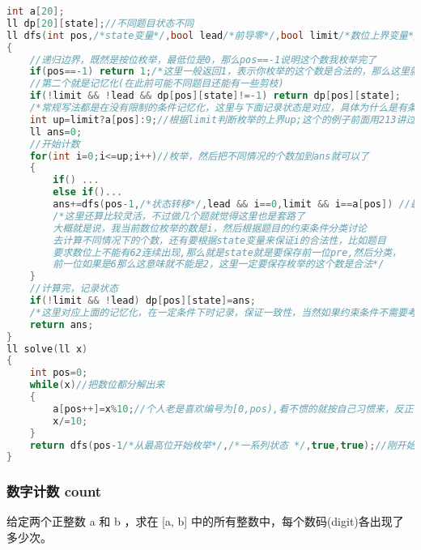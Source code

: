 \begin{lstlisting}[language=C++]
int a[20];
ll dp[20][state];//不同题目状态不同
ll dfs(int pos,/*state变量*/,bool lead/*前导零*/,bool limit/*数位上界变量*/)//不是每个题都要判断前导零
{
    //递归边界，既然是按位枚举，最低位是0，那么pos==-1说明这个数我枚举完了
    if(pos==-1) return 1;/*这里一般返回1，表示你枚举的这个数是合法的，那么这里就需要你在枚举时必须每一位都要满足题目条件，也就是说当前枚举到pos位，一定要保证前面已经枚举的数位是合法的。不过具体题目不同或者写法不同的话不一定要返回1 */
    //第二个就是记忆化(在此前可能不同题目还能有一些剪枝)
    if(!limit && !lead && dp[pos][state]!=-1) return dp[pos][state];
    /*常规写法都是在没有限制的条件记忆化，这里与下面记录状态是对应，具体为什么是有条件的记忆化后面会讲*/
    int up=limit?a[pos]:9;//根据limit判断枚举的上界up;这个的例子前面用213讲过了
    ll ans=0;
    //开始计数
    for(int i=0;i<=up;i++)//枚举，然后把不同情况的个数加到ans就可以了
    {
        if() ...
        else if()...
        ans+=dfs(pos-1,/*状态转移*/,lead && i==0,limit && i==a[pos]) //最后两个变量传参都是这样写的
        /*这里还算比较灵活，不过做几个题就觉得这里也是套路了
        大概就是说，我当前数位枚举的数是i，然后根据题目的约束条件分类讨论
        去计算不同情况下的个数，还有要根据state变量来保证i的合法性，比如题目
        要求数位上不能有62连续出现,那么就是state就是要保存前一位pre,然后分类，
        前一位如果是6那么这意味就不能是2，这里一定要保存枚举的这个数是合法*/
    }
    //计算完，记录状态
    if(!limit && !lead) dp[pos][state]=ans;
    /*这里对应上面的记忆化，在一定条件下时记录，保证一致性，当然如果约束条件不需要考虑lead，这里就是lead就完全不用考虑了*/
    return ans;
}
ll solve(ll x)
{
    int pos=0;
    while(x)//把数位都分解出来
    {
        a[pos++]=x%10;//个人老是喜欢编号为[0,pos),看不惯的就按自己习惯来，反正注意数位边界就行
        x/=10;
    }
    return dfs(pos-1/*从最高位开始枚举*/,/*一系列状态 */,true,true);//刚开始最高位都是有限制并且有前导零的，显然比最高位还要高的一位视为0嘛
}
\end{lstlisting}

\subsubsection{数字计数 count}


给定两个正整数 a 和 b ，求在 [a, b] 中的所有整数中，每个数码(digit)各出现了多少次。

